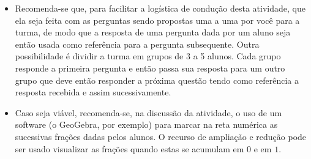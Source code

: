 \begin{multicols}{2}
\begin{orientacoes}{}{}
\begin{itemize} %
    \item       Recomenda-se que, para facilitar a logística de condução desta
atividade, que ela seja feita com as perguntas sendo propostas uma a uma por
você para a turma, de modo que a resposta de uma pergunta dada por um aluno seja
então usada como referência para a pergunta subsequente. Outra possibilidade é
dividir a turma em grupos de 3 a 5 alunos. Cada grupo responde a primeira
pergunta e então passa sua resposta para um outro grupo que deve então responder
a próxima questão tendo como referência a resposta recebida e assim
sucessivamente.
    \item       Caso seja viável, recomenda-se, na discussão da atividade, o uso
de um software (o GeoGebra, por exemplo) para marcar na reta numérica as
sucessivas frações dadas pelos alunos. O recurso de ampliação e redução pode ser
usado visualizar as frações quando estas se acumulam em       $0$       e em
  $1$.
\end{itemize} %




\end{orientacoes}


\end{multicols}
